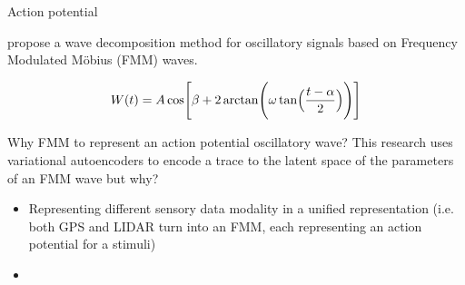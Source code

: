 \section{}
    \begin{frame}[allowframebreaks]{Action potential}
        
        
        \cite{rueda-2021-a-novel-wave-decomposition-for-oscillatory-signals} propose a wave decomposition method for oscillatory signals based on Frequency Modulated M\"obius (FMM) waves.
        
        \begin{equation}
            W(t)
            =
            A
            \cos
            \Biggl[
                \beta
                +
                2
                \arctan
                \Biggl(
                \omega
                \tan
                \Bigl(
                \frac{t-\alpha}{2}
                \Bigr)
                \Biggr)
                \Biggr]
        \end{equation}
        
        \alert{Why FMM to represent an action potential oscillatory wave?}
        This research uses variational autoencoders to encode a trace to the latent space of the parameters of an FMM wave but why?
        \begin{itemize}
            \item Representing different sensory data modality in a unified representation (i.e. both GPS and LIDAR turn into an FMM, each representing an action potential for a stimuli)
            \item 
        \end{itemize}
        
    \end{frame}